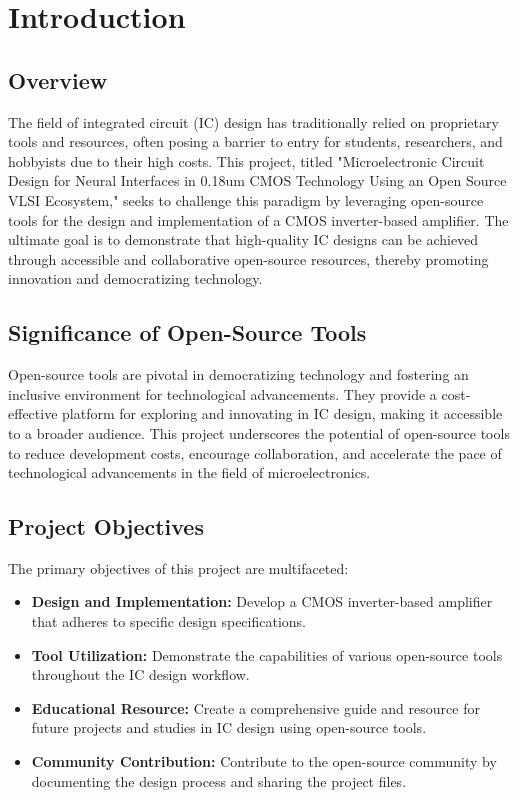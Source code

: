 \chapter{Introduction}
\label{chap:introduction}

\section{Overview}

The field of integrated circuit (IC) design has traditionally relied on proprietary tools and resources, often posing a barrier to entry for students, researchers, and hobbyists due to their high costs. This project, titled "Microelectronic Circuit Design for Neural Interfaces in 0.18um CMOS Technology Using an Open Source VLSI Ecosystem," seeks to challenge this paradigm by leveraging open-source tools for the design and implementation of a CMOS inverter-based amplifier. The ultimate goal is to demonstrate that high-quality IC designs can be achieved through accessible and collaborative open-source resources, thereby promoting innovation and democratizing technology.

\section{Significance of Open-Source Tools}

Open-source tools are pivotal in democratizing technology and fostering an inclusive environment for technological advancements. They provide a cost-effective platform for exploring and innovating in IC design, making it accessible to a broader audience. This project underscores the potential of open-source tools to reduce development costs, encourage collaboration, and accelerate the pace of technological advancements in the field of microelectronics.

\section{Project Objectives}

The primary objectives of this project are multifaceted:
\begin{itemize}
    \item \textbf{Design and Implementation:} Develop a CMOS inverter-based amplifier that adheres to specific design specifications.
    \item \textbf{Tool Utilization:} Demonstrate the capabilities of various open-source tools throughout the IC design workflow.
    \item \textbf{Educational Resource:} Create a comprehensive guide and resource for future projects and studies in IC design using open-source tools.
    \item \textbf{Community Contribution:} Contribute to the open-source community by documenting the design process and sharing the project files.
\end{itemize}

